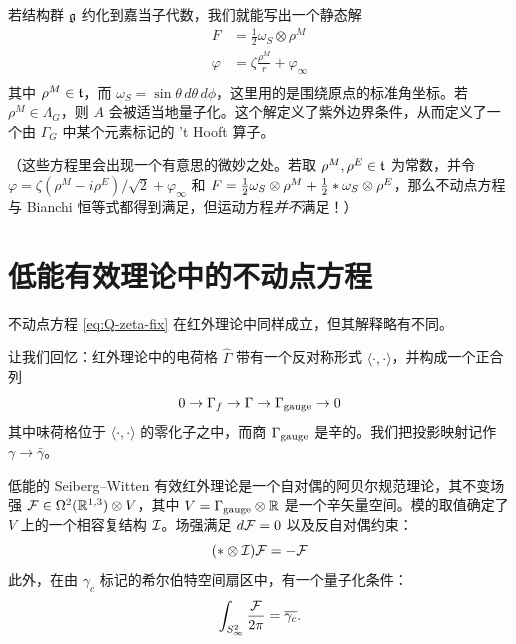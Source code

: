 若结构群 $\mathfrak{g}$ 约化到嘉当子代数，我们就能写出一个静态解
%
\begin{equation}\label{eq:Embed-fix-sol}
\begin{split}
F & = \frac{1}{2} \omega_S \otimes \rho^M \\
\varphi & = \zeta \frac{\rho^M}{r} + \varphi_\infty \\
\end{split}
\end{equation}
%
其中 $\rho^M\in \mathfrak{t}$，而 $\omega_S = \sin\theta\, d\theta\, d\phi$，这里用的是围绕原点的标准角坐标。若 $\rho^M \in \Lambda_G$，则 $A$ 会被适当地量子化。这个解定义了紫外边界条件，从而定义了一个由 $\Gamma_G$ 中某个元素标记的 't Hooft 算子。

（这些方程里会出现一个有意思的微妙之处。若取 $\rho^M, \rho^E\in \mathfrak{t}$ 为常数，并令 $\varphi = \zeta(\rho^M-i \rho^E)/\sqrt{2} + \varphi_\infty$ 和 $F = \tfrac{1}{2} \omega_S \otimes \rho^M + \tfrac{1}{2} * \omega_S \otimes \rho^E$，那么不动点方程与 Bianchi 恒等式都得到满足，但运动方程\emph{并不}满足！）

\section{低能有效理论中的不动点方程}
\label{app:Low-Energy-FxdPoint}

不动点方程 \eqref{eq:Q-zeta-fix} 在红外理论中同样成立，但其解释略有不同。

让我们回忆：红外理论中的电荷格 $\hat \Gamma$ 带有一个反对称形式 $\langle \cdot, \cdot \rangle $，并构成一个正合列
%
\begin{equation}
0 \rightarrow \Gamma_f \rightarrow \Gamma \rightarrow
\Gamma_{\rm gauge} \rightarrow 0
\end{equation}
%
其中味荷格位于 $\langle \cdot, \cdot \rangle $ 的零化子之中，而商 $\Gamma_{\rm gauge} $ 是辛的。我们把投影映射记作 $\gamma \to \bar \gamma$。

低能的 Seiberg--Witten 有效红外理论是一个自对偶的阿贝尔规范理论，其不变场强 $\mathcal{F} \in \Omega^2(\mathbb{R}^{1,3}) \otimes V$，其中 $V= \Gamma_{\rm gauge} \otimes \mathbb{R}$ 是一个辛矢量空间。模的取值确定了 $V$ 上的一个相容复结构 $\mathcal{I}$。场强满足 $d \mathcal{F} =0$ 以及反自对偶约束：
%
\begin{equation}
(*\otimes \mathcal{I})\mathcal{F} = - \mathcal{F}
\end{equation}
%
此外，在由 $\gamma_c$ 标记的希尔伯特空间扇区中，有一个量子化条件：
%
\begin{equation}
\int_{S^2_{\infty}} \frac{\mathcal{F}}{2\pi}  =  \overline{\gamma_c}.
\end{equation}

